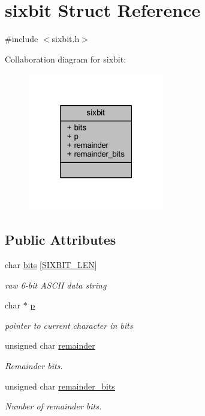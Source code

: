 \hypertarget{structsixbit}{}\section{sixbit Struct Reference}
\label{structsixbit}


{\ttfamily \#include $<$sixbit.\+h$>$}



Collaboration diagram for sixbit\+:
\nopagebreak
\begin{figure}[H]
\begin{center}
\leavevmode
\includegraphics[width=169pt]{structsixbit__coll__graph}
\end{center}
\end{figure}
\subsection*{Public Attributes}
\begin{DoxyCompactItemize}
\item 
char \mbox{\hyperlink{structsixbit_a1e67b3ecd6e03edbd1696fc1f4fea185}{bits}} \mbox{[}\mbox{\hyperlink{sixbit_8h_a3a8670b3483f4813642412fac44d1c0b}{S\+I\+X\+B\+I\+T\+\_\+\+L\+EN}}\mbox{]}
\begin{DoxyCompactList}\small\item\em raw 6-\/bit A\+S\+C\+II data string \end{DoxyCompactList}\item 
char $\ast$ \mbox{\hyperlink{structsixbit_a59c600e66f61778c74acac424a75d48e}{p}}
\begin{DoxyCompactList}\small\item\em pointer to current character in bits \end{DoxyCompactList}\item 
unsigned char \mbox{\hyperlink{structsixbit_a8960c5f633f7591019c7c0101a7faf47}{remainder}}
\begin{DoxyCompactList}\small\item\em Remainder bits. \end{DoxyCompactList}\item 
unsigned char \mbox{\hyperlink{structsixbit_ac9d104dae7c7f24fe883155e26a47714}{remainder\+\_\+bits}}
\begin{DoxyCompactList}\small\item\em Number of remainder bits. \end{DoxyCompactList}\end{DoxyCompactItemize}


